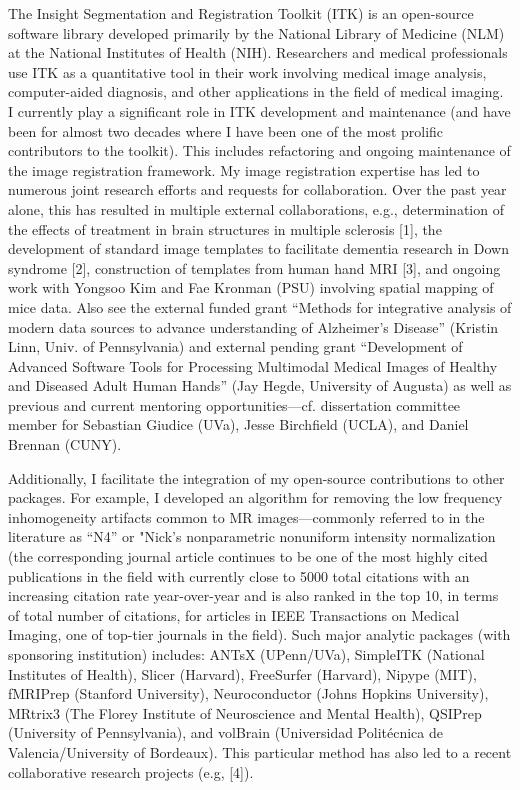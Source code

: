 \documentclass[
  11pt,
]{article}
\begin{document}
The Insight Segmentation and Registration Toolkit (ITK) is an
open-source software library developed primarily by the National Library
of Medicine (NLM) at the National Institutes of Health (NIH).
Researchers and medical professionals use ITK as a quantitative tool in
their work involving medical image analysis, computer-aided diagnosis,
and other applications in the field of medical imaging. I currently play
a significant role in ITK development and maintenance (and have been for
almost two decades where I have been one of the most prolific
contributors to the toolkit). This includes refactoring and ongoing
maintenance of the image registration framework. My image registration
expertise has led to numerous joint research efforts and requests for
collaboration. Over the past year alone, this has resulted in multiple
external collaborations, e.g., determination of the effects of treatment
in brain structures in multiple sclerosis {[}1{]}, the development of
standard image templates to facilitate dementia research in Down
syndrome {[}2{]}, construction of templates from human hand MRI {[}3{]},
and ongoing work with Yongsoo Kim and Fae Kronman (PSU) involving
spatial mapping of mice data. Also see the external funded grant
``Methods for integrative analysis of modern data sources to advance
understanding of Alzheimer's Disease'' (Kristin Linn, Univ. of
Pennsylvania) and external pending grant ``Development of Advanced
Software Tools for Processing Multimodal Medical Images of Healthy and
Diseased Adult Human Hands'' (Jay Hegde, University of Augusta) as well
as previous and current mentoring opportunities---cf. dissertation
committee member for Sebastian Giudice (UVa), Jesse Birchfield (UCLA),
and Daniel Brennan (CUNY).

Additionally, I facilitate the integration of my open-source
contributions to other packages. For example, I developed an algorithm
for removing the low frequency inhomogeneity artifacts common to MR
images---commonly referred to in the literature as ``N4'' or "Nick's
nonparametric nonuniform intensity normalization (the corresponding
journal article continues to be one of the most highly cited
publications in the field with currently close to 5000 total citations
with an increasing citation rate year-over-year and is also ranked in
the top 10, in terms of total number of citations, for articles in IEEE
Transactions on Medical Imaging, one of top-tier journals in the field).
Such major analytic packages (with sponsoring institution) includes:
ANTsX (UPenn/UVa), SimpleITK (National Institutes of Health), Slicer
(Harvard), FreeSurfer (Harvard), Nipype (MIT), fMRIPrep (Stanford
University), Neuroconductor (Johns Hopkins University), MRtrix3 (The
Florey Institute of Neuroscience and Mental Health), QSIPrep (University
of Pennsylvania), and volBrain (Universidad Politécnica de
Valencia/University of Bordeaux). This particular method has also led to
a recent collaborative research projects (e.g, {[}4{]}).
\end{document}
